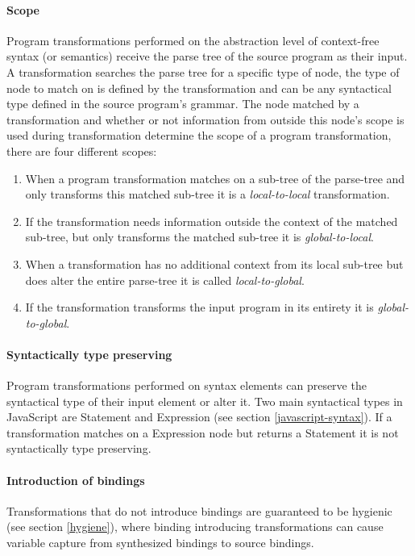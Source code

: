 \paragraph{Scope}
Program transformations performed on the abstraction level of context-free syntax (or semantics) receive the parse tree of the source program as their input. A transformation searches the parse tree for a specific type of node, the type of node to match on is defined by the transformation and can be any syntactical type defined in the source program's grammar. The node matched by a transformation and whether or not information from outside this node's scope is used during transformation determine the scope of a program transformation, there are four different scopes:

\begin{enumerate}
	\item When a program transformation matches on a sub-tree of the parse-tree and only transforms this matched sub-tree it is a \textit{local-to-local} transformation. 
	\item If the transformation needs information outside the context of the matched sub-tree, but only transforms the matched sub-tree it is \textit{global-to-local}. 
	\item When a transformation has no additional context from its local sub-tree but does alter the entire parse-tree it is called \textit{local-to-global}. 
	\item If the transformation transforms the input program in its entirety it is \textit{global-to-global}.
\end{enumerate}

\paragraph{Syntactically type preserving}
Program transformations performed on syntax elements can preserve the syntactical type of their input element or alter it. Two main syntactical types in JavaScript are Statement and Expression (see section \ref{javascript-syntax}). If a transformation matches on a Expression node but returns a Statement it is not syntactically type preserving.

\paragraph{Introduction of bindings}
Transformations that do not introduce bindings are guaranteed to be hygienic (see section \ref{hygiene}), where binding introducing transformations can cause variable capture from synthesized bindings to source bindings.

